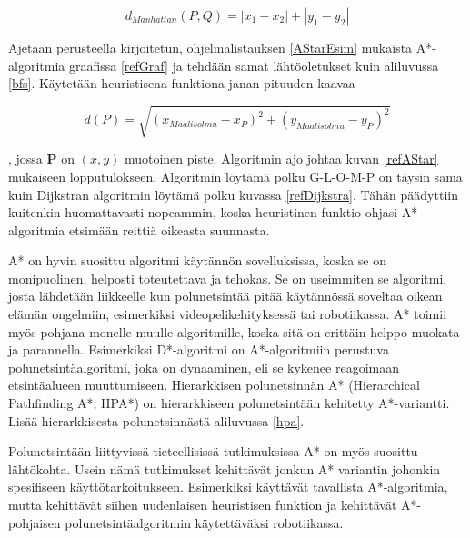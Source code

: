 \[ d_{Manhattan}(P,Q) =  |x_1 - x_2| + |y_1 - y_2|\]
\par

	Ajetaan \textcite{MathewAndMalathy} perusteella kirjoitetun, 
ohjelmalistauksen \ref{AStarEsim} mukaista A*-algoritmia graafissa 
\ref{refGraf} ja tehdään samat lähtöoletukset kuin aliluvussa \ref{bfs}. 
Käytetään heuristisena funktiona janan pituuden kaavaa

\[ d(P) = \sqrt{(x_{Maalisolmu}-x_P)^2 + (y_{Maalisolmu}-y_P)^2} \]

, jossa \textbf{P} on $(x,y)$ muotoinen piste. Algoritmin ajo johtaa kuvan 
\ref{refAStar} mukaiseen lopputulokseen. Algoritmin löytämä polku G-L-O-M-P on 
täysin sama kuin Dijkstran algoritmin löytämä polku kuvassa 
\ref{refDijkstra}. Tähän päädyttiin kuitenkin huomattavasti nopeammin, koska 
heuristinen funktio ohjasi A*-algoritmia etsimään reittiä oikeasta suunnasta. 
\par
	A* on hyvin suosittu algoritmi käytännön sovelluksissa, koska se on 
monipuolinen, helposti toteutettava ja tehokas. Se on useimmiten se algoritmi, 
josta lähdetään liikkeelle kun polunetsintää pitää käytännössä soveltaa 
oikean elämän ongelmiin, esimerkiksi videopelikehityksessä tai 
robotiikassa.\cite{ProcediaAStar} A* toimii myös pohjana monelle muulle 
algoritmille, koska sitä on erittäin helppo muokata ja 
parannella.\cite{ProcediaAStar} Esimerkiksi D*-algoritmi on A*-algoritmiin 
perustuva polunetsintäalgoritmi, joka on dynaaminen, eli se kykenee 
reagoimaan etsintäalueen muuttumiseen.\cite{applSciLawande} Hierarkkisen 
polunetsinnän A* (Hierarchical Pathfinding A*, HPA*) on hierarkkiseen 
polunetsintään kehitetty A*-variantti. Lisää hierarkkisesta polunetsinnästä 
aliluvussa \ref{hpa}.\cite{applSciLawande} \par
	Polunetsintään liittyvissä tieteellisissä tutkimuksissa A* on myös 
suosittu lähtökohta. Usein nämä tutkimukset kehittävät jonkun A* variantin 
johonkin spesifiseen käyttötarkoitukseen.\cite{ProcediaAStar} Esimerkiksi 
\textcite{MathewAndMalathy} käyttävät tavallista A*-algoritmia, mutta 
kehittävät siihen uudenlaisen heuristisen funktion ja 
\textcite{DelaunayVoronoiAStar} kehittävät A*-pohjaisen polunetsintäalgoritmin 
käytettäväksi robotiikassa.

